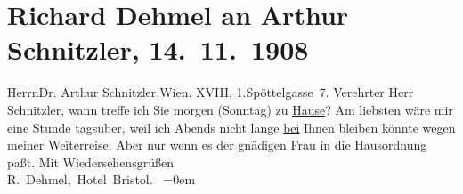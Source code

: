 

         
         \renewcommand{\erwaehntePersonen}{Personen: Olga Schnitzler}
         \renewcommand{\erwaehnteOrte}{Orte: Edmund-Weiß-Gasse, Hotel Bristol, I., Innere Stadt, Wien, XVIII., Währing}
         \renewcommand{\erwaehnteWerke}{}
               \section[Richard Dehmel an Arthur Schnitzler, 14. 11. 1908]{ Richard Dehmel an Arthur Schnitzler, 14. 11. 1908}\nopagebreak{}\rehead{ }\begin{ledgroupsized}[t]{13cm}\normalsize\beginnumbering \toendnotes[C]{\smallbreak\pagebreak[2]} 
\pstart{}{\pb}Herrn\pend{}\pstart{}Dr. Arthur Schnitzler.\pend{}\pstart{}Wien. XVIII, 1.\pend{}\pstart{}Spöttelgasse 7.\pend{}{\bigskip}\pstart
           \noindent{}{\pb}Verehrter Herr Schnitzler, wann treffe ich Sie morgen
                  (Sonntag) zu \uline{Hause}? Am liebsten wäre
               mir eine Stunde tagsüber, weil ich Abends  nicht lange \uline{bei} Ihnen bleiben könnte
               wegen meiner Weiterreise. Aber nur wenn es der gnädigen Frau in die Hausordnung paßt.\pend
           \pstart
           Mit Wiedersehensgrüßen{\\[\baselineskip]}\spacefill\mbox{R. Dehmel, Hotel Bristol.
               }\pend
           \leftskip=0em{}
         
         \endnumbering{}\end{ledgroupsized}  \newcommand{\dateiname}{L01801}\newcommand{\titel}{Richard Dehmel an Arthur Schnitzler, 14. 11. 1908}\newcommand{\editorInnen}{Martin Anton Müller und Gerd-Hermann Susen}
      